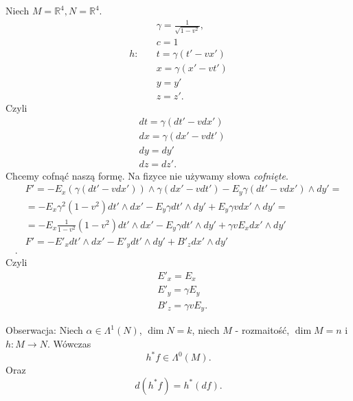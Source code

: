 \documentclass[../main.tex]{subfiles}
\begin{document}
    \begin{przyklad}
        Niech $M = \mathbb{R}^4, N = \mathbb{R}^4$.\\
        \begin{align*}
            &\gamma = \frac{1}{\sqrt{1-v^2} },\\
            &c = 1\\
            h:\quad &t = \gamma(t'-vx')\\
               &x = \gamma(x'-vt')\\
               &y = y'\\
               &z = z'
        .\end{align*}
        Czyli
        \begin{align*}
            &dt = \gamma(dt' - v dx')\\
            &dx = \gamma(dx' - v dt')\\
            &dy = dy'\\
            &dz = dz'
        .\end{align*}
        Chcemy cofnąć naszą formę. Na fizyce nie używamy słowa \textit{cofnięte}.
        \begin{align*}
            &F' = -E_x\left( \gamma\left( dt' - vdx' \right)  \right) \land \gamma \left( dx'-vdt' \right) - E_y \gamma\left( dt' - vdx' \right) \land dy'=\\
            &= -E_x \gamma^2 \left( 1 - v^2 \right) dt' \land dx' - E_y\gamma dt'\land dy' + E_y\gamma v dx'\land dy'= \\
            &= -E_x \frac{1}{1-v^2}\left( 1-v^2 \right) dt'\land dx' - E_y \gamma dt'\land dy' + \gamma v E_x dx'\land dy' \\
            &F' = -E'_x dt'\land dx' - E'_y dt' \land dy' + B'_z dx'\land dy' \\
        .\end{align*}
        Czyli
        \begin{align*}
            &E'_x = E_x\\
            &E'_y = \gamma E_y\\
            &B'_z = \gamma v E_y
        .\end{align*}
    \end{przyklad}

    \begin{figure}[h]
        \centering
        \label{fig:fig_60}
    \end{figure}

    Obserwacja: Niech $\alpha \in \Lambda^1(N)$, $\dim N = k$, niech $M$ - rozmaitość, $\dim M = n$ i $h: M\to N$. Wówczas
    \[
        h^*f\in \Lambda^0(M)
    .\]
    Oraz
    \[
        d(h^*f) = h^*(df)
    .\]
\end{document}
